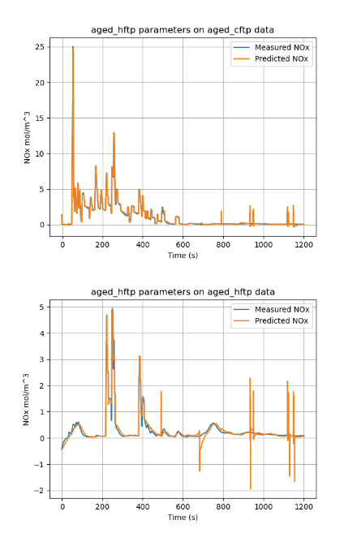 \begin{figure}[H]
        \begin{minipage}{0.3\textwidth}
                \includegraphics[width = \textwidth]{./figs/figs_new_mdl/aged_hftp_aged_cftp.png}
        \end{minipage}
        \begin{minipage}{0.3\textwidth}
                \includegraphics[width = \textwidth]{./figs/figs_new_mdl/aged_hftp_aged_hftp.png}
        \end{minipage}
        \begin{minipage}{0.3\textwidth}

\end{minipage}
\end{figure}
